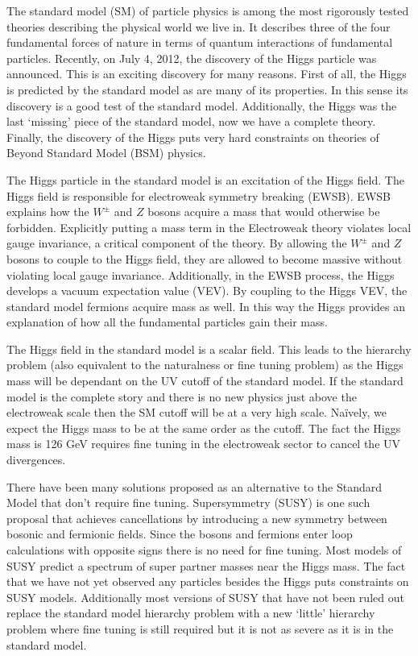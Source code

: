 
The standard model (SM) of particle physics is among the most rigorously tested theories describing the physical world we live in.
It describes three of the four fundamental forces of nature in terms of quantum interactions of fundamental particles.
Recently, on July 4, 2012, the discovery of the Higgs particle was announced.
This is an exciting discovery for many reasons.
First of all, the Higgs is predicted by the standard model as are many of its properties.
In this sense its discovery is a good test of the standard model.
Additionally, the Higgs was the last `missing' piece of the standard model, now we have a complete theory.
Finally, the discovery of the Higgs puts very hard constraints on theories of Beyond Standard Model (BSM) physics.

The Higgs particle in the standard model is an excitation of the Higgs field.
The Higgs field is responsible for electroweak symmetry breaking (EWSB).
EWSB explains how the $W^{\pm}$ and $Z$ bosons acquire a mass that would otherwise be forbidden.
Explicitly putting a mass term in the Electroweak theory violates local gauge invariance, a critical component of the theory.
By allowing the $W^{\pm}$ and $Z$ bosons to couple to the Higgs field, they are allowed to become massive without violating local gauge invariance.
Additionally, in the EWSB process, the Higgs develops a vacuum expectation value (VEV).
By coupling to the Higgs VEV, the standard model fermions acquire mass as well.
In this way the Higgs provides an explanation of how all the fundamental particles gain their mass.

The Higgs field in the standard model is a scalar field.
This leads to the hierarchy problem (also equivalent to the naturalness or fine tuning problem) as the Higgs mass will be dependant on the UV cutoff of the standard model.
If the standard model is the complete story and there is no new physics just above the electroweak scale then the SM cutoff will be at a very high scale.
Naïvely, we expect the Higgs mass to be at the same order as the cutoff.
The fact the Higgs mass is 126 GeV requires fine tuning in the electroweak sector to cancel the UV divergences.

There have been many solutions proposed as an alternative to the Standard Model that don't require fine tuning.
Supersymmetry (SUSY) is one such proposal that achieves cancellations by introducing a new symmetry between bosonic and fermionic fields.
Since the bosons and fermions enter loop calculations with opposite signs there is no need for fine tuning.
Most models of SUSY predict a spectrum of super partner masses near the Higgs mass.
The fact that we have not yet observed any particles besides the Higgs puts constraints on SUSY models.
Additionally most versions of SUSY that have not been ruled out replace the standard model hierarchy problem with a new  `little' hierarchy problem where fine tuning is still required but it is not as severe as it is in the standard model.

